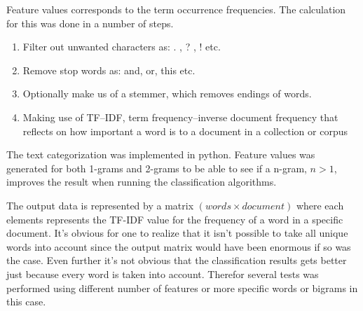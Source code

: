 Feature values corresponds to the term occurrence frequencies.
The calculation for this was done in a number of steps.
\begin{enumerate}
\item Filter out unwanted characters as: . , ? , ! etc.
\item Remove stop words as: and, or, this etc.
\item Optionally make us of a stemmer, which removes endings of words.
\item Making use of TF–IDF, term frequency–inverse document frequency that
reflects on how important a word is to a document in a collection or corpus
\end{enumerate}
The text categorization was implemented in python. Feature values was generated
for both 1-grams and 2-grams to be able to see if a n-gram, $n > 1$, improves
the result when running the classification algorithms.

The output data is represented by a matrix $(words \times document)$ where each
elements represents the TF-IDF value for the frequency of a word in a specific
document.
It's obvious for one to realize that it isn't possible to take all unique words
into account since the output matrix would have been enormous if so was the
case. Even further it's not obvious that the classification results gets better
just because every word is taken into account. Therefor several tests was
performed using different number of features or more specific words or bigrams
in this case.
